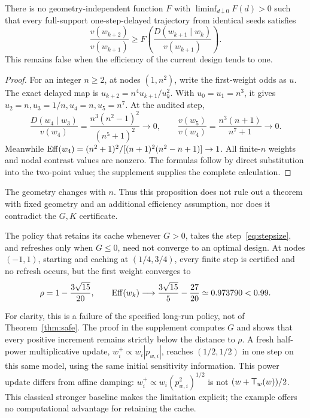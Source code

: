 \documentclass[11pt]{article}
\begin{document}
\begin{proposition}\label{prop:relative}
There is no geometry-independent function $F$ with $\liminf_{d\downarrow0}F(d)>0$ such that every full-support one-step-delayed trajectory from identical seeds satisfies
\[
 \frac{v(w_{k+2})}{v(w_{k+1})}\ge
 F\!\left(\frac{D(w_{k+1}\mid w_k)}{v(w_{k+1})}\right).
\]
This remains false when the efficiency of the current design tends to one.
\end{proposition}
\begin{proof}
For an integer $n\ge2$, at nodes $(1,n^2)$, write the first-weight odds as $u$. The exact delayed map is $u_{k+2}=n^4u_{k+1}/u_k^2$.
With $u_0=u_1=n^3$, it gives $u_2=n,u_3=1/n,u_4=n,u_5=n^7$.
At the audited step,
\[
 \frac{D(w_4\mid w_3)}{v(w_4)}
 =\frac{n^3(n^2-1)^2}{(n^5+1)^2}\to0,
 \qquad\frac{v(w_5)}{v(w_4)}
 =\frac{n^3(n+1)}{n^7+1}\to0.
\]
Meanwhile $\operatorname{Eff}(w_4)=(n^2+1)^2/[(n+1)^2(n^2-n+1)]\to1$.
All finite-$n$ weights and nodal contrast values are nonzero. The formulas follow by direct substitution into the two-point value; the supplement supplies the complete calculation.
\end{proof}
The geometry changes with $n$. Thus this proposition does not rule out a theorem with fixed geometry and an additional efficiency assumption, nor does it contradict the $G,K$ certificate.

\begin{proposition}\label{prop:stall}
The policy that retains its cache whenever $G>0$, takes the step~\eqref{eq:stepsize}, and refreshes only when $G\le0$, need not converge to an optimal design.
At nodes $(-1,1)$, starting and caching at $(1/4,3/4)$, every finite step is certified and no refresh occurs, but the first weight converges to
\[
 \rho=1-\frac{3\sqrt{15}}{20},\qquad
 \operatorname{Eff}(w_k)\longrightarrow\frac{3\sqrt{15}}5-\frac{27}{20}
 \simeq0.973790<0.99.
\]
\end{proposition}
For clarity, this is a failure of the specified long-run policy, not of Theorem~\ref{thm:safe}.
The proof in the supplement computes $G$ and shows that every positive increment remains strictly below the distance to $\rho$.
A fresh half-power multiplicative update, $w_i^+\propto w_i|p_{w,i}|$, reaches $(1/2,1/2)$ in one step on this same model, using the same initial sensitivity information. This power update differs from affine damping: $w_i^+\propto w_i(p_{w,i}^2)^{1/2}$ is not $(w+\mathsf T_w(w))/2$. This classical stronger baseline makes the limitation explicit; the example offers no computational advantage for retaining the cache.
\end{document}

